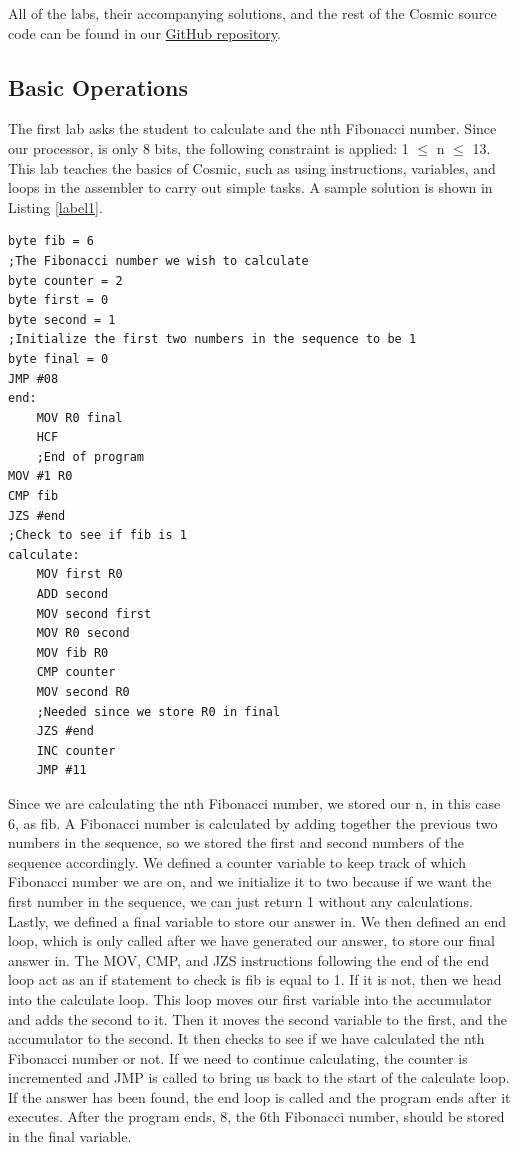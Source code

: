 \documentclass[conference]{IEEEtran}
\begin{document}
All of the labs, their accompanying solutions, and the rest of the Cosmic source code can be found in our \href{https://github.com/clbx/Cosmic}{GitHub repository}.\\

\subsection{Basic Operations}
The first lab asks the student to calculate and the nth Fibonacci number. Since our processor, is only 8 bits, the following constraint is applied: 1 $\leq$ n $\leq$ 13. This lab teaches the basics of Cosmic, such as using instructions, variables, and loops in the assembler to carry out simple tasks. A sample solution is shown in Listing \ref{label1}.

\begin{lstlisting}[caption={Cosmic assembly to find the nth Fibonacci number.}, label = {label1}]
byte fib = 6
;The Fibonacci number we wish to calculate
byte counter = 2
byte first = 0
byte second = 1
;Initialize the first two numbers in the sequence to be 1
byte final = 0
JMP #08
end:
    MOV R0 final
    HCF
    ;End of program
MOV #1 R0
CMP fib
JZS #end
;Check to see if fib is 1
calculate:
    MOV first R0
    ADD second
    MOV second first
    MOV R0 second
    MOV fib R0
    CMP counter
    MOV second R0
    ;Needed since we store R0 in final
    JZS #end
    INC counter
    JMP #11
\end{lstlisting}

Since we are calculating the nth Fibonacci number, we stored our n, in this case 6, as fib. A Fibonacci number is calculated by adding together the previous two numbers in the sequence, so we stored the first and second numbers of the sequence accordingly. We defined a counter variable to keep track of which Fibonacci number we are on, and we initialize it to two because if we want the first number in the sequence, we can just return 1 without any calculations. Lastly, we defined a final variable to store our answer in. We then defined an end loop, which is only called after we have generated our answer, to store our final answer in. The MOV, CMP, and JZS instructions following the end of the end loop act as an if statement to check is fib is equal to 1. If it is not, then we head into the calculate loop. This loop moves our first variable into the accumulator and adds the second to it. Then it moves the second variable to the first, and the accumulator to the second. It then checks to see if we have calculated the nth Fibonacci number or not. If we need to continue calculating, the counter is incremented and JMP is called to bring us back to the start of the calculate loop. If the answer has been found, the end loop is called and the program ends after it executes. After the program ends, 8, the 6th Fibonacci number, should be stored in the final variable.
\end{document}
